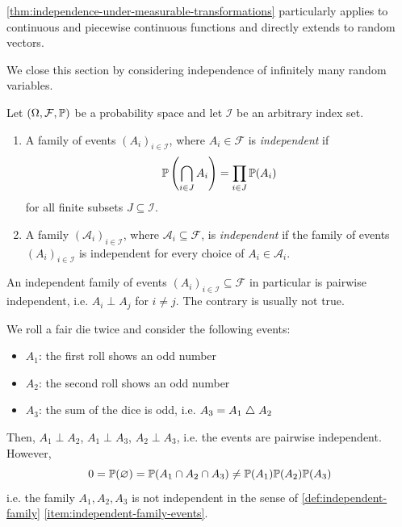 \begin{remark}
\autoref{thm:independence-under-measurable-transformations} particularly applies to continuous and piecewise continuous functions and directly extends to random vectors.
\end{remark}

We close this section by considering independence of infinitely many random variables.


\begin{definition}\label{def:independent-family}
Let $(\Omega, \mathcal{F}, \mathbb{P})$ be a probability space and let $\mathcal{I}$ be an arbitrary index set.
\begin{enumerate}[label=(\roman*)]
  \item  \label{item:independent-family-events}
  A family of events $(A_i)_{i \in \mathcal{I}}$, where $A_i \in \mathcal{F}$ is \emph{independent} if
  \begin{equation}\label{eq:independent-family-events}
  \mathbb{P}\left(\bigcap_{i \in J} A_i\right) = \prod_{i \in J} \mathbb{P}(A_i)
  \end{equation}
  for all finite subsets $J \subseteq \mathcal{I}$.
  \item \label{item:independent-family-sets-of-events}
  A family $(\mathcal{A}_i)_{i \in \mathcal{I}}$, where $\mathcal{A}_i \subseteq \mathcal{F}$, is \emph{independent} if the family of events $(A_i)_{i \in \mathcal{I}}$ is independent for every choice of $A_i \in \mathcal{A}_i$. 
  \qedhere
\end{enumerate}
\end{definition}

\begin{remark}
An independent family of events $(A_i)_{i \in \mathcal{I}} \subseteq \mathcal{F}$ in particular is pairwise independent, i.e. $A_i \perp A_j$ for $i \neq j$.
The contrary is usually not true.
\end{remark}
\begin{example}
We roll a fair die twice and consider the following events:
\begin{itemize}
\item $A_1$: the first roll shows an odd number
\item $A_2$: the second roll shows an odd number
\item $A_3$: the sum of the dice is odd, i.e. $A_3 = A_1 \mathrel{\triangle} A_2$ 
\end{itemize}

Then, $A_1 \perp A_2$, $A_1 \perp A_3$, $A_2 \perp A_3$, i.e. the events are pairwise independent.
However, 
\[
0 = \mathbb{P}(\varnothing) = \mathbb{P}(A_1 \cap A_2 \cap A_3) \neq \mathbb{P}(A_1)\mathbb{P}(A_2)\mathbb{P}(A_3)
\]
i.e. the family $A_1, A_2, A_3$ is not independent in the sense of \autoref{def:independent-family} \ref{item:independent-family-events}.
\end{example}


